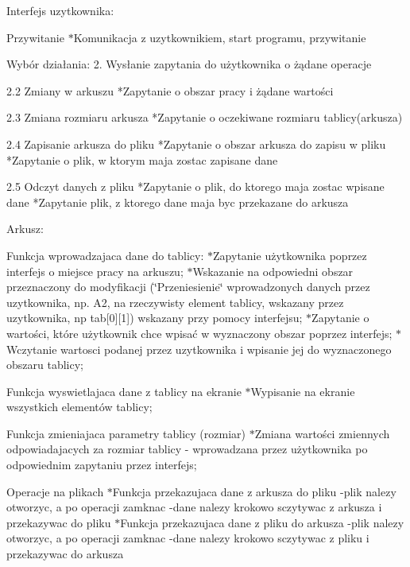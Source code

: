 Interfejs uzytkownika\+:
\begin{DoxyEnumerate}
\item Przywitanie $\ast$\+Komunikacja z uzytkownikiem, start programu, przywitanie
\item Wybór działania\+: 2. Wysłanie zapytania do użytkownika o żądane operacje \begin{DoxyVerb}2.2 Zmiany w arkuszu
    *Zapytanie o obszar pracy i żądane wartości

    2.3 Zmiana rozmiaru arkusza
        *Zapytanie o oczekiwane rozmiaru tablicy(arkusza)

        2.4 Zapisanie arkusza do pliku
            *Zapytanie o obszar arkusza do zapisu w pliku
            *Zapytanie o plik, w ktorym maja zostac zapisane dane

                2.5 Odczyt danych z pliku
                    *Zapytanie o plik, do ktorego maja zostac wpisane dane
                    *Zapytanie plik, z ktorego dane maja byc przekazane do arkusza
\end{DoxyVerb}

\end{DoxyEnumerate}

Arkusz\+:
\begin{DoxyEnumerate}
\item Funkcja wprowadzajaca dane do tablicy\+: $\ast$\+Zapytanie użytkownika poprzez interfejs o miejsce pracy na arkuszu; $\ast$\+Wskazanie na odpowiedni obszar przeznaczony do modyfikacji (\char`\"{}\+Przeniesienie\char`\"{} wprowadzonych danych przez uzytkownika, np. A2, na rzeczywisty element tablicy, wskazany przez uzytkownika, np tab\mbox{[}0\mbox{]}\mbox{[}1\mbox{]}) wskazany przy pomocy interfejsu; $\ast$\+Zapytanie o wartości, które użytkownik chce wpisać w wyznaczony obszar poprzez interfejs; $\ast$\+Wczytanie wartosci podanej przez uzytkownika i wpisanie jej do wyznaczonego obszaru tablicy;
\item Funkcja wyswietlajaca dane z tablicy na ekranie $\ast$\+Wypisanie na ekranie wszystkich elementów tablicy;
\item Funkcja zmieniajaca parametry tablicy (rozmiar) $\ast$\+Zmiana wartości zmiennych odpowiadajacych za rozmiar tablicy -\/ wprowadzana przez użytkownika po odpowiednim zapytaniu przez interfejs;
\item Operacje na plikach $\ast$\+Funkcja przekazujaca dane z arkusza do pliku -\/plik nalezy otworzyc, a po operacji zamknac -\/dane nalezy krokowo sczytywac z arkusza i przekazywac do pliku $\ast$\+Funkcja przekazujaca dane z pliku do arkusza -\/plik nalezy otworzyc, a po operacji zamknac -\/dane nalezy krokowo sczytywac z pliku i przekazywac do arkusza 
\end{DoxyEnumerate}